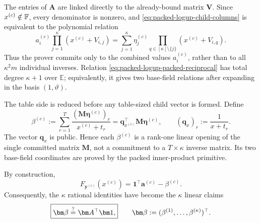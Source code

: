 \documentclass[runningheads]{llncs}
\begin{document}
The entries of \(\bm A\) are linked directly to the already-bound
matrix \(\bm V\).  Since \(x^{(c)}\notin{\mathbb{F}}\), every denominator is
nonzero, and \eqref{eq:packed-logup-child-columns} is equivalent to the
polynomial relation
\begin{equation}
\boxed{
    a_i^{(c)}
      \prod_{j=1}^{\kappa}(x^{(c)}+V_{i,j})
    =
      \sum_{j=1}^{\kappa}
        \eta_j^{(c)}
        \prod_{q\in[\kappa]\setminus\{j\}}
          (x^{(c)}+V_{i,q}).}
\label{eq:packed-logup-packed-reciprocal}
\end{equation}
Thus the prover commits only to the combined values
\(a_i^{(c)}\), rather than to all
\(\kappa^2m\) individual inverses.  Relation
\eqref{eq:packed-logup-packed-reciprocal} has total degree
\(\kappa+1\) over \(\mathbb E\); equivalently, it gives two base-field
relations after expanding in the basis \((1,\vartheta)\).

The table side is reduced before any table-sized child vector is
formed.  Define
\begin{equation}
    \beta^{(c)}
      :=
      \sum_{r=1}^{T}
        \frac{(\bm M\bm\eta^{(c)})_r}
             {x^{(c)}+t_r}
      =
      \bm q_{x^{(c)}}^\top
      \bm M\bm\eta^{(c)},
    \qquad
    (\bm q_x)_r:=\frac1{x+t_r}.
\label{eq:packed-logup-table-opening}
\end{equation}
The vector \(\bm q_x\) is public.  Hence each \(\beta^{(c)}\) is a
rank-one linear opening of the single committed matrix \(\bm M\), not
a commitment to a \(T\times\kappa\) inverse matrix.  Its two base-field
coordinates are proved by the packed inner-product primitive.

By construction,
\begin{equation}
    F_{\bm y^{(c)}}(x^{(c)})
      =\bm1^\top\bm a^{(c)}-\beta^{(c)}.
\label{eq:packed-logup-child-sum}
\end{equation}
Consequently, the \(\kappa\) rational identities have become the
\(\kappa\) linear claims
\begin{equation}
    \boxed{
    \bm\beta
      \EqOrNot
      \bm A^\top\bm1,}
    \qquad
    \bm\beta
      :=(\beta^{(1)},\ldots,\beta^{(\kappa)})^\top.
\label{eq:packed-logup-initial-child-state}
\end{equation}
\end{document}
